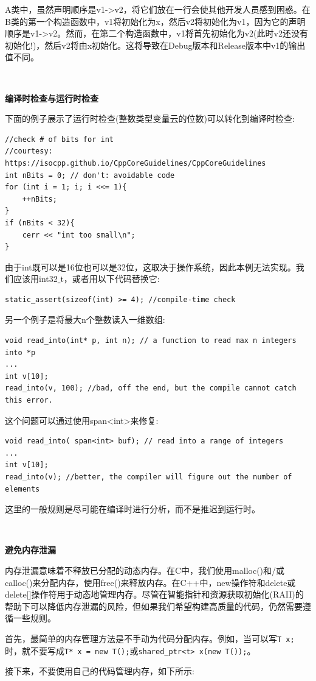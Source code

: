 A类中，虽然声明顺序是v1->v2，将它们放在一行会使其他开发人员感到困惑。在B类的第一个构造函数中，v1将初始化为x，然后v2将初始化为v1，因为它的声明顺序是v1->v2。然而，在第二个构造函数中，v1将首先初始化为v2(此时v2还没有初始化!)，然后v2将由x初始化。这将导致在Debug版本和Release版本中v1的输出值不同。 \par

\noindent\textbf{}\ \par
\textbf{编译时检查与运行时检查} \ \par
下面的例子展示了运行时检查(整数类型变量云的位数)可以转化到编译时检查: \par

\begin{lstlisting}[caption={}]
//check # of bits for int
//courtesy: https://isocpp.github.io/CppCoreGuidelines/CppCoreGuidelines
int nBits = 0; // don't: avoidable code
for (int i = 1; i; i <<= 1){
	++nBits;
}
if (nBits < 32){
	cerr << "int too small\n";
}
\end{lstlisting}

由于int既可以是16位也可以是32位，这取决于操作系统，因此本例无法实现。我们应该用int32\underline{ }t，或者用以下代码替换它: \par

\begin{lstlisting}[caption={}]
static_assert(sizeof(int) >= 4); //compile-time check
\end{lstlisting}

另一个例子是将最大n个整数读入一维数组: \par

\begin{lstlisting}[caption={}]
void read_into(int* p, int n); // a function to read max n integers into *p
...
int v[10];
read_into(v, 100); //bad, off the end, but the compile cannot catch this error.
\end{lstlisting}

这个问题可以通过使用span<int>来修复: \par

\begin{lstlisting}[caption={}]
void read_into( span<int> buf); // read into a range of integers
...
int v[10];
read_into(v); //better, the compiler will figure out the number of elements
\end{lstlisting}

这里的一般规则是尽可能在编译时进行分析，而不是推迟到运行时。 \par

\noindent\textbf{}\ \par
\textbf{避免内存泄漏} \ \par
内存泄漏意味着不释放已分配的动态内存。在C中，我们使用malloc()和/或calloc()来分配内存，使用free()来释放内存。在C++中，new操作符和delete或delete[]操作符用于动态地管理内存。尽管在智能指针和资源获取初始化(RAII)的帮助下可以降低内存泄漏的风险，但如果我们希望构建高质量的代码，仍然需要遵循一些规则。\par
首先，最简单的内存管理方法是不手动为代码分配内存。例如，当可以写\texttt{T x;}时，就不要写成\texttt{T* x = new T();}或\texttt{shared\underline{ }ptr<t> x(new T());}。 \par
接下来，不要使用自己的代码管理内存，如下所示: \par

